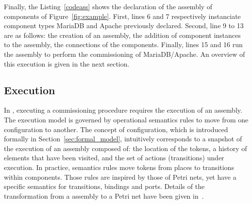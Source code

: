 

Finally, the Listing~\ref{codeass} shows the declaration of the
assembly of components of Figure~\ref{fig:example}. First, lines 6 and
7 respectively instanciate component types MariaDB and Apache
previously declared. Second, line 9 to 13 are as follows: the creation
of an assembly, the addition of component instances to the assembly,
the connections of the components. Finally, lines 15 and 16 run the
assembly to perform the commissioning of MariaDB/Apache. An overview
of this execution is given in the next section.



\subsection{Execution}

In \mad, executing a commissioning procedure requires the execution of
an assembly. The \mad execution model is governed by operational
semantics rules to move from one configuration to another. The concept
of configuration, which is introduced formally in
Section~\ref{sec:formal_model}, intuitively corresponds to a snapshot
of the execution of an assembly composed of: the location of the
tokens, a history of elements that have been visited, and the set of
actions (transitions) under execution. In practice, semantics rules
move tokens from places to transitions within components. Those rules
are inspired by those of Petri nets, yet have a specific semantics for
transitions, bindings and ports. Details of the transformation from a
\mad assembly to a Petri net have been given
in~\cite{coullon:hal-02323641}.

